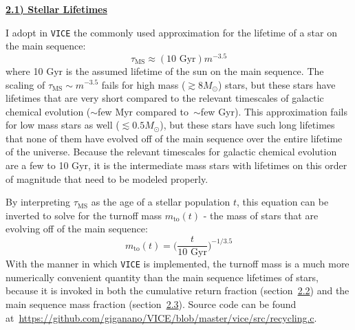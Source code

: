 \documentclass{report}
\begin{document}
\newpage
\noindent 
\begin{center}
\hypertarget{ssp:lifetimes}{
	\underline{\LARGE
		\textbf{2.1) Stellar Lifetimes}
	}
}
\end{center}
I adopt in \texttt{VICE} the commonly used approximation for the lifetime of 
a star on the main sequence: 
\begin{equation}
\tau_\text{MS} \approx (10\text{ Gyr})m^{-3.5}
\end{equation}
where 10 Gyr is the assumed lifetime of the sun on the main sequence. The 
scaling of $\tau_\text{MS}\sim m^{-3.5}$ fails for high mass 
($\gtrsim8M_\odot$) stars, but these stars have lifetimes that are very short 
compared to the relevant timescales of galactic chemical evolution ($\sim$few 
Myr compared to~$\sim$few Gyr). This approximation fails for low mass stars as 
well ($\lesssim0.5M_\odot$), but these stars have such long lifetimes that 
none of them have evolved off of the main sequence over the entire lifetime of 
the universe. Because the relevant timescales for galactic chemical evolution 
are a few to 10 Gyr, it is the intermediate mass stars with lifetimes on this 
order of magnitude that need to be modeled properly. 
\par 
By interpreting $\tau_\text{MS}$ as the age of a stellar population $t$, this 
equation can be inverted to solve for the turnoff mass $m_\text{to}(t)$ - the 
mass of stars that are evolving off of the main sequence: 
\begin{equation}
m_\text{to}(t) = \Big(\frac{t}{10\text{ Gyr}}\Big)^{-1/3.5}
\end{equation}
With the manner in which \texttt{VICE} is implemented, the turnoff mass is 
a much more numerically convenient quantity than the main sequence lifetimes 
of stars, because it is invoked in both the cumulative return 
fraction (section~\hyperlink{ssp:crf}{2.2}) and the main sequence mass 
fraction (section~\hyperlink{ssp:msmf}{2.3}). Source code can be found 
at~\url{https://github.com/giganano/VICE/blob/master/vice/src/recycling.c}. 
\end{document}
